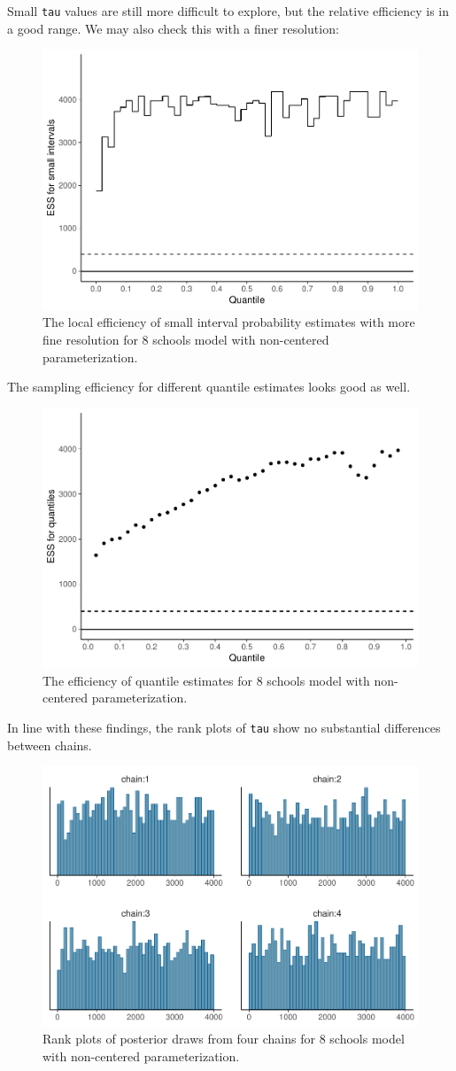 \documentclass[american,]{article}
\begin{document}
Small \texttt{tau} values are still more difficult to explore, but the
relative efficiency is in a good range. We may also check this with a
finer resolution:

\begin{figure}[tp]
  \centering
  \includegraphics[width=0.6\linewidth]{graphics/local-ess-fit-ncp2-finer-1.pdf}
  \caption{The local efficiency of small interval probability estimates with more fine resolution for 8 schools model with non-centered parameterization.}
\end{figure}

The sampling efficiency for different quantile estimates looks good as
well.

\begin{figure}[tp]
  \centering
  \includegraphics[width=0.6\linewidth]{graphics/quantile-ess-fit-ncp2-1.pdf}
  \caption{The efficiency of quantile estimates for 8 schools model with non-centered parameterization.}
\end{figure}

In line with these findings, the rank plots of \texttt{tau} show no
substantial differences between chains.

\begin{figure}[tp]
  \centering
  \includegraphics[width=0.6\linewidth]{graphics/hist-fit-ncp2-1.pdf}
  \caption{Rank plots of posterior draws from four chains for 8 schools model with non-centered parameterization.}
\end{figure}
\end{document}
